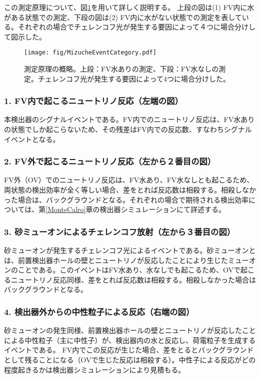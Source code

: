 \documentclass[11pt]{jreport}
\newcommand{\figref}[1]{図\ref{#1}}
\newcommand{\secref}[1]{第\ref{#1}章}
\begin{document}
この測定原理について、\figref{EventCategory}を用いて詳しく説明する。
上段の図は(1) FV内に水がある状態での測定、下段の図は(2) FV内に水がない状態での測定を表している。それぞれの場合でチェレンコフ光が発生する要因によって４つに場合分けして図示した。

\begin{figure}[htbp]
\centering
\texttt{[image: fig/MizucheEventCategory.pdf]}
\caption[測定原理の概略]{測定原理の概略。上段：FV水ありの測定、下段：FV水なしの測定。チェレンコフ光が発生する要因によって4つに場合分けした。}
\label{EventCategory}
\end{figure}

\subsubsection{1. FV内で起こるニュートリノ反応（左端の図）}
本検出器のシグナルイベントである。FV内でのニュートリノ反応は、FV水ありの状態でしか起こらないため、その残差はFV内での反応数、すなわちシグナルイベントとなる。


\subsubsection{2. FV外で起こるニュートリノ反応（左から２番目の図）}
FV外（OV）でのニュートリノ反応は、FV水あり、FV水なしとも起こるため、両状態の検出効率が全く等しい場合、差をとれば反応数は相殺する。相殺しなかった場合は、バックグラウンドとなる。それぞれの場合で期待される検出効率については、\secref{MonteCalro}の検出器シミュレーションにて詳述する。

\subsubsection{3. 砂ミューオンによるチェレンコフ放射（左から３番目の図）}
砂ミューオンが発生するチェレンコフ光によるイベントである。砂ミューオンとは、前置検出器ホールの壁とニュートリノが反応したことにより生じたミューオンのことである。このイベントはFV水あり、水なしでも起こるため、OVで起こるニュートリノ反応同様、差をとれば反応数は相殺する。相殺しなかった場合はバックグラウンドとなる。

\subsubsection{4. 検出器外からの中性粒子による反応（右端の図）}
砂ミューオンの発生同様、前置検出器ホールの壁とニュートリノが反応したことによる中性粒子（主に中性子）が、検出器内の水と反応し、荷電粒子を生成するイベントである。
FV内でこの反応が生じた場合、差をとるとバックグラウンドとして残ることになる（OVで生じた反応は相殺する）。中性子による反応がどの程度起きるかは検出器シミュレーションにより見積もる。
\end{document}
